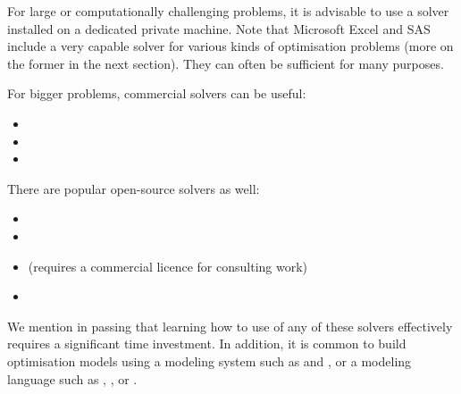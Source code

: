 For large or computationally challenging problems, it is advisable to
use a solver installed on a dedicated private machine. Note that
Microsoft Excel and SAS include a very capable solver for various kinds
of optimisation problems (more on the former in the next section). They can often be sufficient for many
purposes. 

For bigger problems, commercial solvers can be useful:
\begin{itemize}[noitemsep]

\item
\item
\item
\end{itemize}
There are popular open-source solvers as well:

\begin{itemize}[noitemsep]

\item
\item
\item
   (requires a commercial licence for
  consulting work)
\item
\end{itemize}
We mention in passing that learning how to use of any of these solvers
effectively requires a significant time investment. In addition, it is
common to build optimisation models using a modeling system such as
 and ,
or a modeling language such as ,
, or
.

